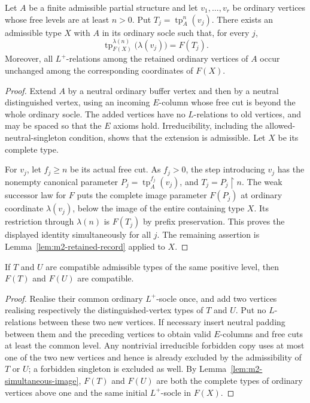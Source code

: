 \begin{lemma}\label{lem:m2-simultaneous-image}
Let $A$ be a finite admissible partial structure and let
$v_1,\ldots,v_r$ be ordinary vertices whose free levels are at least
$n>0$.  Put $T_j=\operatorname{tp}^n_A(v_j)$.  There exists an
admissible type $X$ with $A$ in its ordinary socle such that, for
every $j$,
\[
  \operatorname{tp}^{\lambda(n)}_{F(X)}\bigl(\lambda(v_j)\bigr)
       =F(T_j).
\]
Moreover, all $L^+$-relations among the retained ordinary vertices
of $A$ occur unchanged among the corresponding coordinates of $F(X)$.
\end{lemma}
\begin{proof}
Extend $A$ by a neutral ordinary buffer vertex and then by a
neutral distinguished vertex, using an incoming $E$-column whose free
cut is beyond the whole ordinary socle.  The added vertices have no
$L$-relations to old vertices, and may be spaced so that the $E$
axioms hold.  Irreducibility, including the allowed-neutral-singleton
condition, shows that the extension is admissible.  Let $X$ be its
complete type.

For $v_j$, let $f_j\geq n$ be its actual free cut.  As $f_j>0$, the
step introducing $v_j$ has the nonempty canonical parameter
$P_j=\operatorname{tp}^{f_j}_A(v_j)$, and
$T_j=P_j\restriction n$.  The weak successor law for $F$ puts the
complete image parameter $F(P_j)$ at ordinary coordinate
$\lambda(v_j)$, below the image of the entire containing type $X$.
Its restriction through $\lambda(n)$ is $F(T_j)$ by prefix
preservation.  This proves the displayed identity simultaneously for
all $j$.  The remaining assertion is
Lemma~\ref{lem:m2-retained-record} applied to $X$.
\end{proof}

\begin{lemma}\label{lem:m2-compatibility}
If $T$ and $U$ are compatible admissible types of the same positive
level, then $F(T)$ and $F(U)$ are compatible.
\end{lemma}
\begin{proof}
Realise their common ordinary $L^+$-socle once, and add two vertices
realising respectively the distinguished-vertex types of $T$ and
$U$.  Put no $L$-relations between these two new vertices.  If
necessary insert neutral padding between them and the preceding
vertices to obtain valid $E$-columns and free cuts at least the
common level.  Any nontrivial irreducible forbidden copy uses at most
one of the two new vertices and hence is already excluded by the
admissibility of $T$ or $U$; a forbidden singleton is excluded as
well.  By Lemma~\ref{lem:m2-simultaneous-image}, $F(T)$ and $F(U)$
are both the complete types of ordinary vertices above one and the
same initial $L^+$-socle in $F(X)$.
\end{proof}


